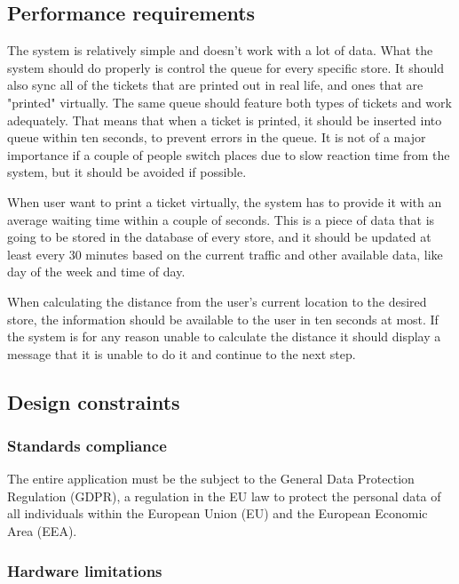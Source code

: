 \FloatBarrier
\newpage
\subsection{Performance requirements}

\hspace{\parindent}The system is relatively simple and doesn't work with a lot of data. What the system should do properly is control the queue for every specific store. It should also sync all of the tickets that are printed out in real life, and ones that are "printed" virtually. The same queue should feature both types of tickets and work adequately. That means that when a ticket is printed, it should be inserted into queue within ten seconds, to prevent errors in the queue. It is not of a major importance if a couple of people switch places due to slow reaction time from the system, but it should be avoided if possible. 


When user want to print a ticket virtually, the system has to provide it with an average waiting time within a couple of seconds. This is a piece of data that is going to be stored in the database of every store, and it should be updated at least every 30 minutes based on the current traffic and other available data, like day of the week and time of day.


When calculating the distance from the user's current location to the desired store, the information should be available to the user in ten seconds at most. If the system is for any reason unable to calculate the distance it should display a message that it is unable to do it and continue to the next step.

\newpage

\subsection{Design constraints}

\subsubsection{Standards compliance}
\hspace{\parindent}The entire application must be the subject to the General Data Protection Regulation (GDPR), a regulation in the EU law to protect the personal data of all individuals within the European Union (EU) and the European Economic Area (EEA).

\subsubsection{Hardware limitations} \label{hardware}

